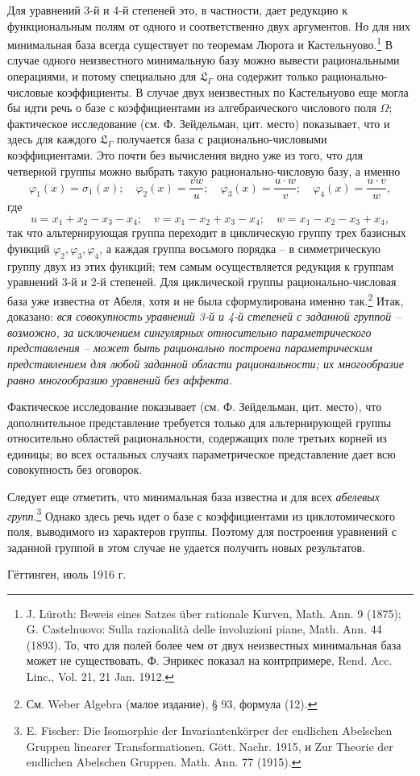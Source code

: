 \documentclass[11pt]{article}
\begin{document}
Для уравнений 3-й и 4-й степеней это, в частности, дает редукцию к функциональным полям от одного и соответственно двух аргументов. Но для них минимальная база всегда существует по теоремам Люрота и Кастельнуово.\footnote{J. Lüroth: Beweis eines Satzes über rationale Kurven, Math. Ann. 9 (1875); G. Castelnuovo: Sulla razionalità delle involuzioni piane, Math. Ann. 44 (1893). То, что для полей более чем от двух неизвестных минимальная база может не существовать, Ф. Энрикес показал на контрпримере, Rend. Acc. Linc., Vol. 21, 21 Jan. 1912.} В случае одного неизвестного минимальную базу можно вывести рациональными операциями, и потому специально для $\mathfrak L_\Gamma$ она содержит только рационально-числовые коэффициенты. В случае двух неизвестных по Кастельнуово еще могла бы идти речь о базе с коэффициентами из алгебраического числового поля $\Omega$; фактическое исследование (см. Ф. Зейдельман, цит. место) показывает, что и здесь для каждого $\mathfrak L_\Gamma$ получается база с рационально-числовыми коэффициентами. Это почти без вычисления видно уже из того, что для четверной группы можно выбрать такую рационально-числовую базу, а именно
\[
\varphi_1(x)=\sigma_1(x);\quad \varphi_2(x)=\frac{v w}{u};\quad \varphi_3(x)=\frac{u\cdot w}{v};\quad \varphi_4(x)=\frac{u\cdot v}{w},
\]
где
\[
u=x_1+x_2-x_3-x_4;\quad v=x_1-x_2+x_3-x_4;\quad w=x_1-x_2-x_3+x_4,
\]
так что альтернирующая группа переходит в циклическую группу трех базисных функций $\varphi_2,\varphi_3,\varphi_4$, а каждая группа восьмого порядка -- в симметрическую группу двух из этих функций; тем самым осуществляется редукция к группам уравнений 3-й и 2-й степеней. Для циклической группы рационально-числовая база уже известна от Абеля, хотя и не была сформулирована именно так.\footnote{См. Weber Algebra (малое издание), § 93, формула (12).} Итак, доказано: \emph{вся совокупность уравнений 3-й и 4-й степеней с заданной группой -- возможно, за исключением сингулярных относительно параметрического представления -- может быть рационально построена параметрическим представлением для любой заданной области рациональности; их многообразие равно многообразию уравнений без аффекта.}

Фактическое исследование показывает (см. Ф. Зейдельман, цит. место), что дополнительное представление требуется только для альтернирующей группы относительно областей рациональности, содержащих поле третьих корней из единицы; во всех остальных случаях параметрическое представление дает всю совокупность без оговорок.

Следует еще отметить, что минимальная база известна и для всех \emph{абелевых групп}.\footnote{E. Fischer: Die Isomorphie der Invariantenkörper der endlichen Abelschen Gruppen linearer Transformationen. Gött. Nachr. 1915, и Zur Theorie der endlichen Abelschen Gruppen. Math. Ann. 77 (1915).} Однако здесь речь идет о базе с коэффициентами из циклотомического поля, выводимого из характеров группы. Поэтому для построения уравнений с заданной группой в этом случае не удается получить новых результатов.

Гёттинген, июль 1916 г.

\clearpage
\end{document}
